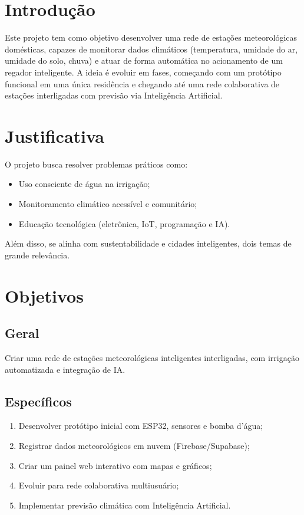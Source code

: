 \documentclass[
    12pt,
    openright,
    oneside,
    a4paper,
    brazil
]{abntex2}
\begin{document}
\imprimircapa

\imprimirfolhaderosto*

\renewcommand{\contentsname}{SUMÁRIO}
\tableofcontents
\cleardoublepage


\section{Introdução}
Este projeto tem como objetivo desenvolver uma rede de estações meteorológicas 
domésticas, capazes de monitorar dados climáticos (temperatura, umidade do ar, umidade 
do solo, chuva) e atuar de forma automática no acionamento de um regador inteligente. 
A ideia é evoluir em fases, começando com um protótipo funcional em uma única residência e 
chegando até uma rede colaborativa de estações interligadas com previsão via Inteligência 
Artificial.

\section{Justificativa}
O projeto busca resolver problemas práticos como:
\begin{itemize}
  \item Uso consciente de água na irrigação;
  \item Monitoramento climático acessível e comunitário;
  \item Educação tecnológica (eletrônica, IoT, programação e IA).
\end{itemize}

Além disso, se alinha com sustentabilidade e cidades inteligentes, dois temas de grande 
relevância.

\section{Objetivos}

\subsection{Geral}
Criar uma rede de estações meteorológicas inteligentes interligadas, com irrigação 
automatizada e integração de IA.  

\subsection{Específicos}
\begin{enumerate}
  \item Desenvolver protótipo inicial com ESP32, sensores e bomba d’água;
  \item Registrar dados meteorológicos em nuvem (Firebase/Supabase);
  \item Criar um painel web interativo com mapas e gráficos;
  \item Evoluir para rede colaborativa multiusuário;
  \item Implementar previsão climática com Inteligência Artificial.
\end{enumerate}
\end{document}
